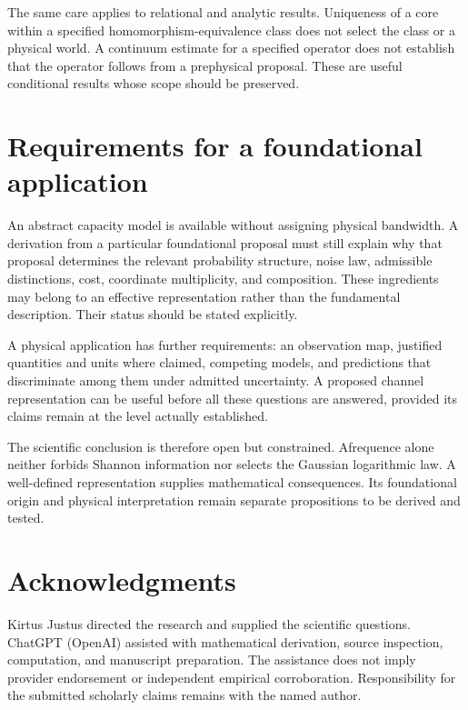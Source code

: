\documentclass{article}
\begin{document}
The same care applies to relational and analytic results. Uniqueness of a core within a specified homomorphism-equivalence class does not select the class or a physical world. A continuum estimate for a specified operator does not establish that the operator follows from a prephysical proposal. These are useful conditional results whose scope should be preserved.

\section{Requirements for a foundational application}
An abstract capacity model is available without assigning physical bandwidth. A derivation from a particular foundational proposal must still explain why that proposal determines the relevant probability structure, noise law, admissible distinctions, cost, coordinate multiplicity, and composition. These ingredients may belong to an effective representation rather than the fundamental description. Their status should be stated explicitly.

A physical application has further requirements: an observation map, justified quantities and units where claimed, competing models, and predictions that discriminate among them under admitted uncertainty. A proposed channel representation can be useful before all these questions are answered, provided its claims remain at the level actually established.

The scientific conclusion is therefore open but constrained. Afrequence alone neither forbids Shannon information nor selects the Gaussian logarithmic law. A well-defined representation supplies mathematical consequences. Its foundational origin and physical interpretation remain separate propositions to be derived and tested.

\section*{Acknowledgments}
Kirtus Justus directed the research and supplied the scientific questions. ChatGPT (OpenAI) assisted with mathematical derivation, source inspection, computation, and manuscript preparation. The assistance does not imply provider endorsement or independent empirical corroboration. Responsibility for the submitted scholarly claims remains with the named author.
\end{document}
